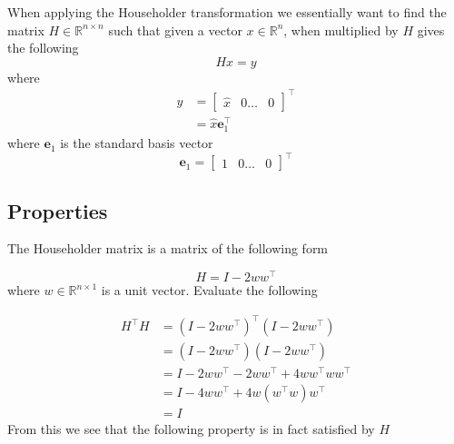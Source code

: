 When applying the Householder transformation we essentially want to find the matrix $H\in\mathbb{R}^{n\times n}$ such that given a vector $x\in\mathbb{R}^{n}$, when multiplied by $H$ gives the following
\begin{equation*}
  Hx=y
\end{equation*}
where
\begin{equation*}
  \begin{split}
    y&=
    \begin{bmatrix}
    \hat{x} & 0 \hdots & 0
    \end{bmatrix}^{\top} \\
    &=\hat{x}\mathbf{e}_{1}^{\top}
  \end{split}
\end{equation*}
where $\mathbf{e}_{1}$ is the standard basis vector
\begin{equation*}
  \mathbf{e}_{1}=
  \begin{bmatrix}
    1 & 0 \hdots & 0
  \end{bmatrix}^{\top}
\end{equation*}


\subsection{Properties}

The Householder matrix is a matrix of the following form

\begin{equation*}
  H=I-2ww^{\top}
\end{equation*}
where $w\in\mathbb{R}^{n\times1}$ is a unit vector.
Evaluate the following

\begin{equation*}
  \begin{split}
    H^{\top}H&=(I-2ww^{\top})^{\top}(I-2ww^{\top}) \\
    &=(I-2ww^{\top})(I-2ww^{\top}) \\
    &=I-2ww^{\top}-2ww^{\top}+4ww^{\top}ww^{\top} \\
    &=I-4ww^{\top}+4w(w^{\top}w)w^{\top} \\
    &=I
  \end{split}
\end{equation*}
From this we see that the following property is in fact satisfied by $H$

